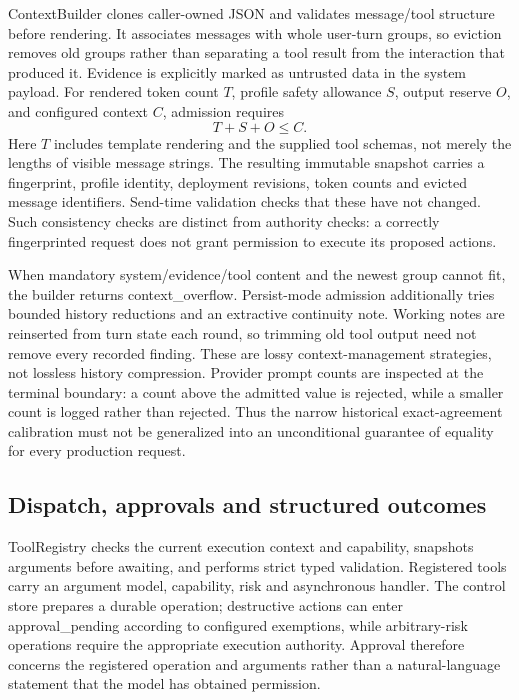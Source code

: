 \documentclass[11pt,a4paper]{article}
\begin{document}
ContextBuilder clones caller-owned JSON and validates message/tool structure before rendering. It associates messages with whole user-turn groups, so eviction removes old groups rather than separating a tool result from the interaction that produced it. Evidence is explicitly marked as untrusted data in the system payload. For rendered token count $T$, profile safety allowance $S$, output reserve $O$, and configured context $C$, admission requires
\begin{equation}
T + S + O \leq C.
\end{equation}
Here $T$ includes template rendering and the supplied tool schemas, not merely the lengths of visible message strings. The resulting immutable snapshot carries a fingerprint, profile identity, deployment revisions, token counts and evicted message identifiers. Send-time validation checks that these have not changed. Such consistency checks are distinct from authority checks: a correctly fingerprinted request does not grant permission to execute its proposed actions.

When mandatory system/evidence/tool content and the newest group cannot fit, the builder returns context\_overflow. Persist-mode admission additionally tries bounded history reductions and an extractive continuity note. Working notes are reinserted from turn state each round, so trimming old tool output need not remove every recorded finding. These are lossy context-management strategies, not lossless history compression. Provider prompt counts are inspected at the terminal boundary: a count above the admitted value is rejected, while a smaller count is logged rather than rejected. Thus the narrow historical exact-agreement calibration must not be generalized into an unconditional guarantee of equality for every production request.

\subsection{Dispatch, approvals and structured outcomes}
ToolRegistry checks the current execution context and capability, snapshots arguments before awaiting, and performs strict typed validation. Registered tools carry an argument model, capability, risk and asynchronous handler. The control store prepares a durable operation; destructive actions can enter approval\_pending according to configured exemptions, while arbitrary-risk operations require the appropriate execution authority. Approval therefore concerns the registered operation and arguments rather than a natural-language statement that the model has obtained permission.
\end{document}
